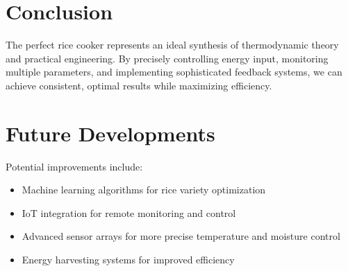 \documentclass{article}
\begin{document}
\section{Conclusion}
The perfect rice cooker represents an ideal synthesis of thermodynamic theory and practical engineering. By precisely controlling energy input, monitoring multiple parameters, and implementing sophisticated feedback systems, we can achieve consistent, optimal results while maximizing efficiency.

\section{Future Developments}
Potential improvements include:
\begin{itemize}
    \item Machine learning algorithms for rice variety optimization
    \item IoT integration for remote monitoring and control
    \item Advanced sensor arrays for more precise temperature and moisture control
    \item Energy harvesting systems for improved efficiency
\end{itemize}
\end{document}
